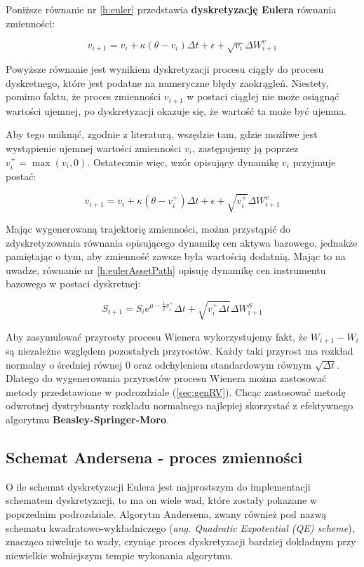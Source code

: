 \documentclass{pracamgr}
\begin{document}
Poniższe równanie nr \ref{h:euler} przedstawia \textbf{dyskretyzację Eulera} równania zmienności:
 
\begin{equation}\label{h:euler}
v_{i+1}  = v_i + \kappa (\theta - v_i) \Delta t + \epsilon +  \sqrt{v_i} \Delta W^{v}_{i+1}
\end{equation}

Powyższe równanie jest wynikiem dyskretyzacji procesu ciągły do procesu dyskretnego, które jest
podatne na numeryczne błędy zaokrągleń. Niestety, pomimo faktu, że proces zmienności $v_{i+1}$ w postaci ciągłej nie może osiągnąć wartości ujemnej, po dyskretyzacji okazuje się, że wartość ta może być ujemna. 

Aby tego uniknąć, zgodnie z literaturą, wszędzie tam, gdzie możliwe jest wystąpienie ujemnej 
wartości zmienności $v_i$, zastępujemy ją poprzez $v_i^+ = \max(v_i, 0)$. Ostatecznie więc, wzór
opisujący dynamikę $v_i$ przyjmuje postać:

\begin{equation}\label{h:eulerNonZero}
v_{i+1}  = v_i + \kappa (\theta - v_i^+) \Delta t + \epsilon +  \sqrt{v_i^+} \Delta W^{v}_{i+1}
\end{equation}

Mając wygenerowaną trajektorię zmienności, można przystąpić do zdyskretyzowania równania opisującego 
dynamikę cen aktywa bazowego, jednakże pamiętając o tym, aby zmienność zawsze była wartością dodatnią. 
Mając to na uwadze, równanie nr \ref{h:eulerAssetPath} opisuję dynamikę cen instrumentu bazowego w postaci dyskretnej:

\begin{equation}\label{h:eulerAssetPath}
S_{i+1} = S_i e^{\mu - \frac{1}{2} v_i^+} \Delta t + \sqrt{v_i^+ \Delta t}  \Delta W_{i+1}^S
\end{equation}
  
Aby zasymulować przyrosty procesu Wienera wykorzystujemy fakt, że $W_{i+1}  - W_{i}$ są niezależne względem pozostałych przyrostów. 
Każdy taki przyrost ma rozkład normalny o średniej równej $0$  oraz odchyleniem standardowym równym $\sqrt{\Delta t}$. 
Dlatego do wygenerowania przyrostów procesu Wienera można zastosować metody przedstawione w podrozdziale (\ref{sec:genRV}). Chcąc zastosować metodę odwrotnej dystrybuanty rozkładu normalnego najlepiej skorzystać z efektywnego algorytmu \textbf{Beasley-Springer-Moro}.


\subsection{Schemat Andersena - proces zmienności}
\label{sec:algorytm_andersena}
O ile schemat dyskretyzacji Eulera jest najprostszym do implementacji schematem dyskretyzacji, to ma on wiele wad, które zostały pokazane w poprzednim podrozdziale.
Algorytm Andersena, zwany również pod nazwą schematu kwadratowo-wykładniczego (\textit{ang. Quadratic Expotential (QE) scheme}),
znacząco niweluje to wady, czyniąc proces dyskretyzacji bardziej dokładnym przy niewielkie wolniejszym tempie wykonania algorytmu. 
\end{document}
